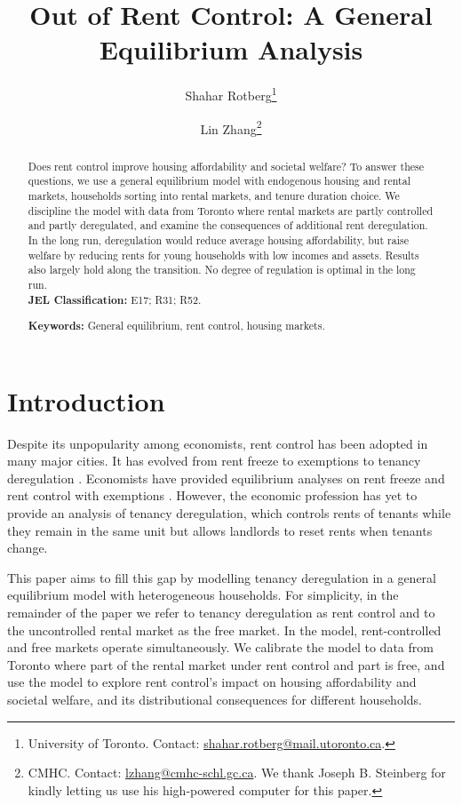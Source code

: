 \documentclass[parskip=full]{article}
\author{
  Shahar Rotberg\footnote{University of Toronto. Contact: \url{shahar.rotberg@mail.utoronto.ca}.} \and Lin Zhang\footnote{CMHC. Contact: \url{lzhang@cmhc-schl.gc.ca}. We thank Joseph B. Steinberg for kindly letting us use his high-powered computer for this paper.}
}
\title{\vspace{-1.8cm}Out of Rent Control: A General Equilibrium Analysis}
\begin{document}
\maketitle

\begin{abstract}
\onehalfspacing
\noindent Does rent control improve housing affordability and societal welfare? To answer these questions, we use a general equilibrium model with endogenous housing and rental markets, households sorting into rental markets, and tenure duration choice. We discipline the model with data from Toronto where rental markets are partly controlled and partly deregulated, and examine the consequences of additional rent deregulation. In the long run, deregulation would reduce average housing affordability, but raise welfare by reducing rents for young households with low incomes and assets. Results also largely hold along the transition. No degree of regulation is optimal in the long run.
\\[1.5ex]

\noindent \textbf{JEL Classification:} E17; R31; R52. 

\noindent \textbf{Keywords:} General equilibrium, rent control, housing markets.
\end{abstract}

\section{Introduction}

Despite its unpopularity among economists, rent control has been adopted in many major cities. It has evolved from rent freeze to exemptions to tenancy deregulation \citep{arnott-1995,arnott-2003}. Economists have provided equilibrium analyses on rent freeze and rent control with exemptions \citep[among many others]{hayek-1929,fs-1946,fallis-1985}. However, the economic profession has yet to provide an analysis of tenancy deregulation, which controls rents of tenants while they remain in the same unit but allows landlords to reset rents when tenants change.

This paper aims to fill this gap by modelling tenancy deregulation in a general equilibrium model with heterogeneous households. For simplicity, in the remainder of the paper we refer to tenancy deregulation as rent control and to the uncontrolled rental market as the free market. In the model, rent-controlled and free markets operate simultaneously. We calibrate the model to data from Toronto where part of the rental market under rent control and part is free, and use the model to explore rent control's impact on housing affordability and societal welfare, and its distributional consequences for different households.
\end{document}
